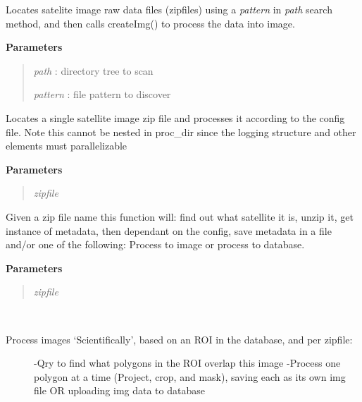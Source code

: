 \documentclass[letterpaper,10pt,openany,oneside]{sphinxmanual}
\begin{document}
\begin{fulllineitems}
\begin{fulllineitems}
\label{code:SigLib.SigLib.proc_Dir}
Locates satelite image raw data files (zipfiles) using a
\emph{pattern} in \emph{path} search method, and then calls createImg()
to process the data into image.

\textbf{Parameters}
\begin{quote}

\emph{path}    : directory tree to scan

\emph{pattern} : file pattern to discover
\end{quote}

\end{fulllineitems}


\begin{fulllineitems}
\label{code:SigLib.SigLib.proc_File}
Locates a single satellite image zip file and processes it according 
to the config file.  Note this cannot be nested in proc\_dir since the 
logging structure and other elements must parallelizable

\textbf{Parameters}
\begin{quote}

\emph{zipfile}
\end{quote}

\end{fulllineitems}


\begin{fulllineitems}
\label{code:SigLib.SigLib.retrieve}
Given a zip file name this function will: find out what satellite it is, unzip it, get instance of metadata, then 
dependant on the config, save metadata in a file and/or one of the following: Process to image or process to database.

\textbf{Parameters}
\begin{quote}

\emph{zipfile}
\end{quote}

\end{fulllineitems}


\begin{fulllineitems}
\label{code:SigLib.SigLib.scientific}~\begin{description}
\item[{Process images `Scientifically', based on an ROI in the database, and per zipfile:}] \leavevmode
-Qry to find what polygons in the ROI overlap this image
-Process one polygon at a time (Project, crop, and mask), saving each as its own img file OR uploading img data to database


\end{description}
\end{fulllineitems}
\end{fulllineitems}
\end{document}
